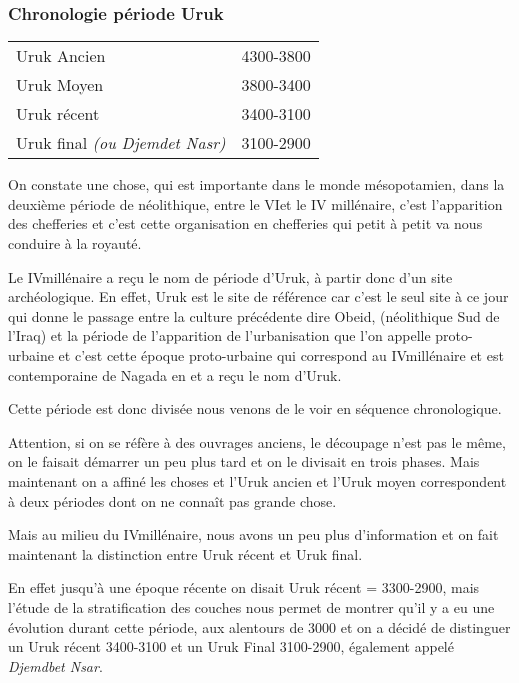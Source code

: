 \documentclass[a4paper,10pt]{article}
\begin{document}
\subsubsection{Chronologie période Uruk}

\begin{tabular}{ll}
  Uruk Ancien                         & 4300-3800 \\
  Uruk Moyen                          & 3800-3400 \\
  Uruk récent                         & 3400-3100 \\
  Uruk final \emph{(ou Djemdet Nasr)} & 3100-2900  \\
\end{tabular}

\espace
On constate une chose, qui est importante dans le monde mésopotamien, 
dans la deuxième période de néolithique, entre le VI\ieme et le IV\ieme 
millénaire, c'est l'apparition des chefferies et c'est cette organisation 
en chefferies qui petit à petit va nous conduire à la royauté.

Le IV\ieme millénaire a reçu le nom de période d'Uruk, à partir donc 
d'un site archéologique. En effet, Uruk est le site de référence car 
c'est le seul site à ce jour qui donne le passage entre la culture 
précédente dire Obeid, (néolithique Sud de l'Iraq) et la période de 
l'apparition de l'urbanisation que l'on appelle proto-urbaine et c'est 
cette époque proto-urbaine qui correspond au IV\ieme millénaire et est 
contemporaine de Nagada en \kmt et a reçu le nom d'Uruk.

Cette période est donc divisée nous venons de le voir en séquence 
chronologique.

Attention, si on se réfère à des ouvrages anciens, le découpage n'est 
pas le même, on le faisait démarrer un peu plus tard et on le divisait 
en trois phases. Mais maintenant on a affiné les choses et l'Uruk ancien 
et l'Uruk moyen correspondent à deux périodes dont on ne connaît pas 
grande chose.

Mais au milieu du IV\ieme millénaire, nous avons un peu plus d'information 
et on fait maintenant la distinction entre Uruk récent et Uruk final.

En effet jusqu'à une époque récente on disait Uruk récent = 3300-2900, 
mais l'étude de la stratification des couches nous permet de montrer 
qu'il y a eu une évolution durant cette période, aux alentours de 3000 
et on a décidé de distinguer un Uruk récent 3400-3100 et un Uruk Final 
3100-2900, également appelé \emph{Djemdbet Nsar}.
\end{document}
